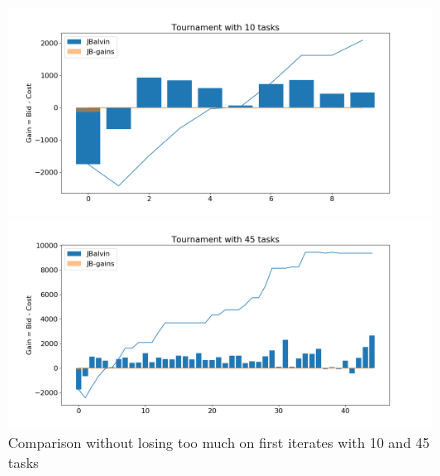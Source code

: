 \documentclass[11pt]{article}
\begin{document}
\begin{figure}[ht]
    \centering
\begin{minipage}[]{0.4\textwidth}
\includegraphics[width=\textwidth]{plots/jb-gains_10.png}
\end{minipage}
\begin{minipage}[]{0.4\textwidth}
\includegraphics[width=\textwidth]{plots/jb-gains_45.png}
\end{minipage}
\caption{Comparison without losing too much on first iterates with 10 and 45 tasks}
\label{fig:jb-gain}
\end{figure}
\end{document}
